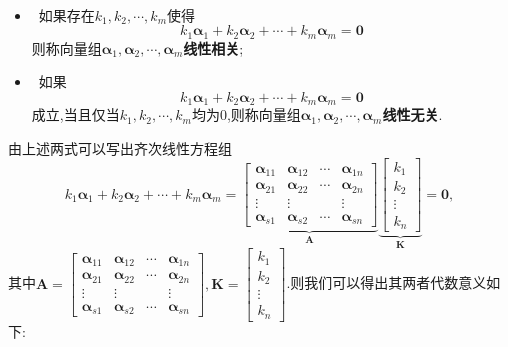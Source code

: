 \documentclass[9pt,a4paper]{book}
\begin{document}
\begin{defination}[线性关系]
	\ \\
	\begin{itemize}
		\item[\color{HotPink1} \textleaf ] {\color{HotPink1}}\ 如果存在$ k_1,k_2,\cdots,k_m $使得\[  k_1\bm{\alpha}_1+k_2\bm{\alpha}_2+\cdots+k_m\bm{\alpha}_m=\bm{0} \]则称向量组$  \bm{\alpha}_1,\bm{\alpha}_2,\cdots,\bm{\alpha}_m $\textbf{线性相关};
		\item[\color{HotPink1} \textleaf ] {\color{HotPink1}}\ 如果\[  k_1\bm{\alpha}_1+k_2\bm{\alpha}_2+\cdots+k_m\bm{\alpha}_m=\bm{0} \]成立,当且仅当$ k_1,k_2,\cdots,k_m $均为$ 0 $,则称向量组$  \bm{\alpha}_1,\bm{\alpha}_2,\cdots,\bm{\alpha}_m $\textbf{线性无关}.
	\end{itemize}
由上述两式可以写出齐次线性方程组\begin{equation*}
k_1\bm{\alpha}_1+k_2\bm{\alpha}_2+\cdots+k_m\bm{\alpha}_m=\underbrace{\begin{bmatrix}
\bm{\alpha}_{11}&\bm{\alpha}_{12}&\cdots&\bm{\alpha}_{1n}\\
\bm{\alpha}_{21}&\bm{\alpha}_{22}&\cdots&\bm{\alpha}_{2n}\\
\vdots&\vdots&&\vdots\\
\bm{\alpha}_{s1}&\bm{\alpha}_{s2}&\cdots&\bm{\alpha}_{sn}
\end{bmatrix}}_{\displaystyle\bm{A} }
\underbrace{\begin{bmatrix}
k_1\\k_2\\\vdots\\k_n
\end{bmatrix}}_{\displaystyle\bm{K} }
=\bm{0},
\end{equation*}
其中$ \bm{A}=\begin{bmatrix}
\bm{\alpha}_{11}&\bm{\alpha}_{12}&\cdots&\bm{\alpha}_{1n}\\
\bm{\alpha}_{21}&\bm{\alpha}_{22}&\cdots&\bm{\alpha}_{2n}\\
\vdots&\vdots&&\vdots\\
\bm{\alpha}_{s1}&\bm{\alpha}_{s2}&\cdots&\bm{\alpha}_{sn}
\end{bmatrix},\bm{K}=\begin{bmatrix}
k_1\\k_2\\\vdots\\k_n
\end{bmatrix} $.则我们可以得出其两者代数意义如下:

\end{defination}
\end{document}

